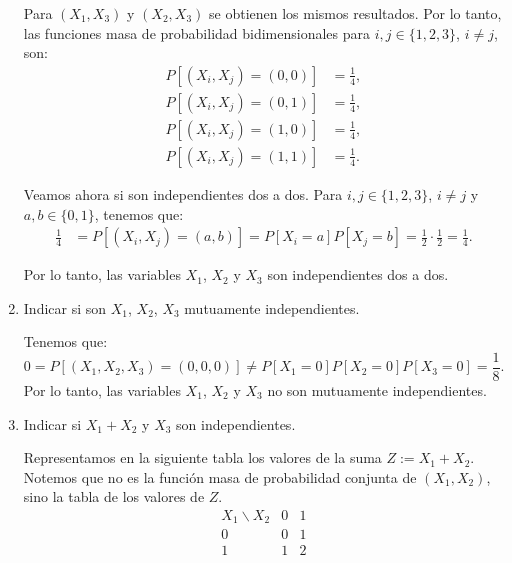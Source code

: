 \begin{ejercicio}
\begin{enumerate}
        Para $(X_1, X_3)$ y $(X_2, X_3)$ se obtienen los mismos resultados. Por lo tanto, las funciones masa de probabilidad bidimensionales para $i,j \in \{1,2,3\}$, $i \neq j$, son:
        \begin{align*}
            P[(X_i, X_j) = (0,0)] &= \frac{1}{4}, \\
            P[(X_i, X_j) = (0,1)] &= \frac{1}{4}, \\
            P[(X_i, X_j) = (1,0)] &= \frac{1}{4}, \\
            P[(X_i, X_j) = (1,1)] &= \frac{1}{4}.
        \end{align*}

        Veamos ahora si son independientes dos a dos. Para $i,j \in \{1,2,3\}$, $i \neq j$ y $a,b\in \{0,1\}$, tenemos que:
        \begin{align*}
            \frac{1}{4} &= P[(X_i, X_j) = (a,b)] = P[X_i = a]P[X_j = b] = \frac{1}{2} \cdot \frac{1}{2} = \frac{1}{4}.
        \end{align*}

        Por lo tanto, las variables $X_1$, $X_2$ y $X_3$ son independientes dos a dos.

        \item Indicar si son $X_1$, $X_2$, $X_3$ mutuamente independientes.
        
        Tenemos que:
        \begin{equation*}
            0 = P[(X_1, X_2, X_3) = (0,0,0)] \neq P[X_1 = 0]P[X_2 = 0]P[X_3 = 0] = \frac{1}{8}.
        \end{equation*}
        Por lo tanto, las variables $X_1$, $X_2$ y $X_3$ no son mutuamente independientes.

        \item Indicar si $X_1 + X_2$ y $X_3$ son independientes.
        
        Representamos en la siguiente tabla los valores de la suma $Z:=X_1 + X_2$. Notemos que no es la función masa de probabilidad conjunta de $(X_1,X_2)$, sino la tabla de los valores de $Z$.
        \begin{equation*}
            \begin{array}{c|cc}
                X_1\backslash X_2 & 0 & 1 \\
                \hline
                0 & 0 & 1 \\
                1 & 1 & 2
            \end{array}
        \end{equation*}


\end{enumerate}
\end{ejercicio}

